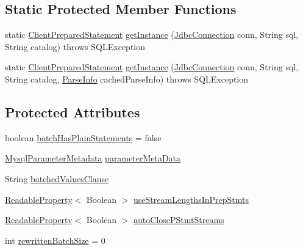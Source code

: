 \subsection*{Static Protected Member Functions}
\begin{DoxyCompactItemize}
\item 
static \mbox{\hyperlink{classcom_1_1mysql_1_1cj_1_1jdbc_1_1_client_prepared_statement}{Client\+Prepared\+Statement}} \mbox{\hyperlink{classcom_1_1mysql_1_1cj_1_1jdbc_1_1_client_prepared_statement_a907760e4207f15f30fe7d2506e240b2c}{get\+Instance}} (\mbox{\hyperlink{interfacecom_1_1mysql_1_1cj_1_1jdbc_1_1_jdbc_connection}{Jdbc\+Connection}} conn, String sql, String catalog)  throws S\+Q\+L\+Exception 
\item 
static \mbox{\hyperlink{classcom_1_1mysql_1_1cj_1_1jdbc_1_1_client_prepared_statement}{Client\+Prepared\+Statement}} \mbox{\hyperlink{classcom_1_1mysql_1_1cj_1_1jdbc_1_1_client_prepared_statement_a5b030cdd8620573bcb233f877acc30b5}{get\+Instance}} (\mbox{\hyperlink{interfacecom_1_1mysql_1_1cj_1_1jdbc_1_1_jdbc_connection}{Jdbc\+Connection}} conn, String sql, String catalog, \mbox{\hyperlink{classcom_1_1mysql_1_1cj_1_1_parse_info}{Parse\+Info}} cached\+Parse\+Info)  throws S\+Q\+L\+Exception 
\end{DoxyCompactItemize}
\subsection*{Protected Attributes}
\begin{DoxyCompactItemize}
\item 
boolean \mbox{\hyperlink{classcom_1_1mysql_1_1cj_1_1jdbc_1_1_client_prepared_statement_a81277367ad12df00619e0926617c0b7b}{batch\+Has\+Plain\+Statements}} = false
\item 
\mbox{\hyperlink{classcom_1_1mysql_1_1cj_1_1jdbc_1_1_mysql_parameter_metadata}{Mysql\+Parameter\+Metadata}} \mbox{\hyperlink{classcom_1_1mysql_1_1cj_1_1jdbc_1_1_client_prepared_statement_ad690e30c46689f85c53a246f76645a93}{parameter\+Meta\+Data}}
\item 
String \mbox{\hyperlink{classcom_1_1mysql_1_1cj_1_1jdbc_1_1_client_prepared_statement_a2ac3bfcd6c8f2c82fcf7aaca644433f5}{batched\+Values\+Clause}}
\item 
\mbox{\hyperlink{interfacecom_1_1mysql_1_1cj_1_1conf_1_1_readable_property}{Readable\+Property}}$<$ Boolean $>$ \mbox{\hyperlink{classcom_1_1mysql_1_1cj_1_1jdbc_1_1_client_prepared_statement_a00359b8d110b9dd194f472b773266ffc}{use\+Stream\+Lengths\+In\+Prep\+Stmts}}
\item 
\mbox{\hyperlink{interfacecom_1_1mysql_1_1cj_1_1conf_1_1_readable_property}{Readable\+Property}}$<$ Boolean $>$ \mbox{\hyperlink{classcom_1_1mysql_1_1cj_1_1jdbc_1_1_client_prepared_statement_a0aaf9a0405cc59b73d21ed48d47f9db1}{auto\+Close\+P\+Stmt\+Streams}}
\item 
int \mbox{\hyperlink{classcom_1_1mysql_1_1cj_1_1jdbc_1_1_client_prepared_statement_acceed2626ed15be5e1d6b7202a92914e}{rewritten\+Batch\+Size}} = 0
\end{DoxyCompactItemize}
